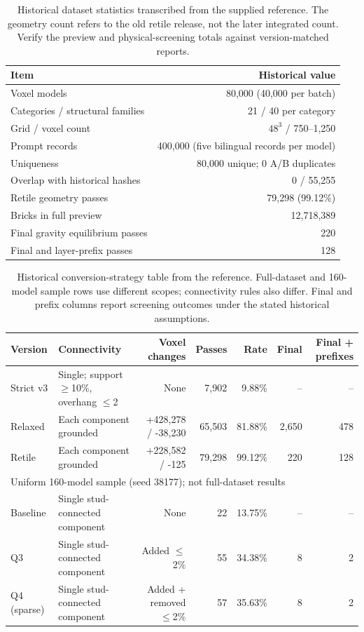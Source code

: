 \begin{table}[!htbp]\centering\small
\begin{tabular}{lr}\toprule
Item & Historical value \\ \midrule
Voxel models & 80,000 (40,000 per batch) \\
Categories / structural families & 21 / 40 per category \\
Grid / voxel count & $48^3$ / 750--1,250 \\
Prompt records & 400,000 (five bilingual records per model) \\
Uniqueness & 80,000 unique; 0 A/B duplicates \\
Overlap with historical hashes & 0 / 55,255 \\
Retile geometry passes & 79,298 (99.12\%) \\
Bricks in full preview & 12,718,389 \\
Final gravity equilibrium passes & 220 \\
Final and layer-prefix passes & 128 \\
\bottomrule\end{tabular}
\caption{Historical dataset statistics transcribed from the supplied reference. The geometry count refers to the old retile release, not the later integrated count. Verify the preview and physical-screening totals against version-matched reports.}
\end{table}

\begin{table}[!htbp]\centering\scriptsize
\begin{tabular}{llrrrrr}\toprule
Version & Connectivity & Voxel changes & Passes & Rate & Final & Final + prefixes \\ \midrule
Strict v3 & Single; support $\geq$10\%, overhang $\leq$2 & None & 7,902 & 9.88\% & -- & -- \\
Relaxed & Each component grounded & +428,278 / -38,230 & 65,503 & 81.88\% & 2,650 & 478 \\
Retile & Each component grounded & +228,582 / -125 & 79,298 & 99.12\% & 220 & 128 \\
\midrule
\multicolumn{7}{l}{Uniform 160-model sample (seed 38177); not full-dataset results} \\
Baseline & Single stud-connected component & None & 22 & 13.75\% & -- & -- \\
Q3 & Single stud-connected component & Added $\leq$2\% & 55 & 34.38\% & 8 & 2 \\
Q4 (sparse) & Single stud-connected component & Added + removed $\leq$2\% & 57 & 35.63\% & 8 & 2 \\
\bottomrule\end{tabular}
\caption{Historical conversion-strategy table from the reference. Full-dataset and 160-model sample rows use different scopes; connectivity rules also differ. Final and prefix columns report screening outcomes under the stated historical assumptions.}
\end{table}

